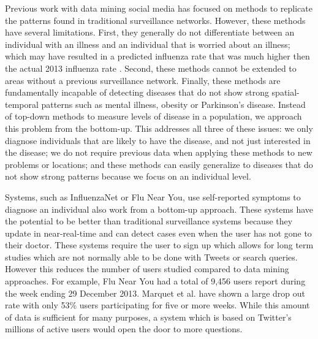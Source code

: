 \documentclass{acm_proc_article-sp}
\begin{document}
Previous work with data mining social media has focused on methods to replicate the patterns found in traditional surveillance networks\cite{Bodnar:2013we,Culotta:2010hx,Goel:2010jf}. However, these methods have several limitations. First, they generally do not differentiate between an individual with an illness and an individual that is worried about an illness; which may have resulted in a predicted influenza rate that was much higher then the actual 2013 influenza rate \cite{Bodnar:2013we,Butler:2013uh,Olson:2013bo,Lamb:2013to}. Second, these methods cannot be extended to areas without a previous surveillance network. Finally, these methods are fundamentally incapable of detecting diseases that do not show strong spatial-temporal patterns such as mental illness, obesity or Parkinson's disease. Instead of top-down methods to measure levels of disease in a population, we approach this problem from the bottom-up. This addresses all three of these issues: we only diagnose individuals that are likely to have the disease, and not just interested in the disease; we do not require previous data when applying these methods to new problems or locations; and these methods can easily generalize to diseases that do not show strong patterns because we focus on an individual level.

Systems, such as InfluenzaNet or Flu Near You, use self-reported symptoms to diagnose an individual also work from a bottom-up approach.\cite{Marquet:2005tb,VanNoort:2007uk} These systems have the potential to be better than traditional surveillance systems because they update in near-real-time and can detect cases even when the user has not gone to their doctor. These systems require the user to sign up which allows for long term studies which are not normally able to be done with Tweets or search queries. However this reduces the number of users studied compared to data mining approaches. For example, Flu Near You had a total of 9,456 users report during the week ending 29 December 2013. Marquet et al. \cite{Marquet:2005tb} have shown a large drop out rate with only 53\% users participating for five or more weeks. While this amount of data is sufficient for many purposes, a system which is based on Twitter's millions of active users would open the door to more questions.


%
%
\end{document}
